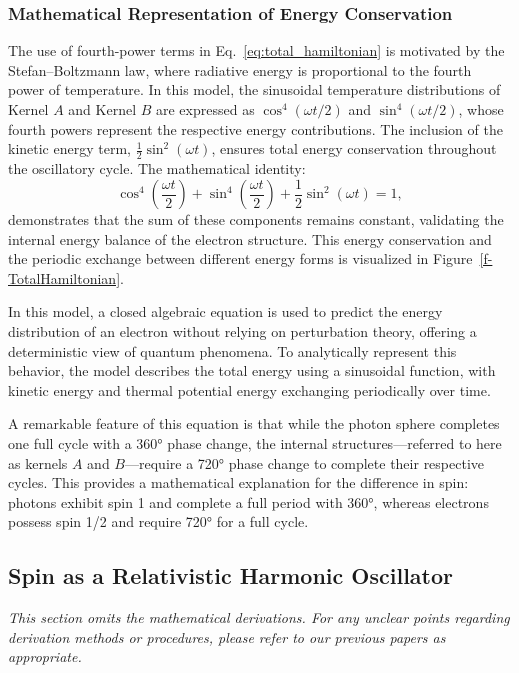 \documentclass[%
 reprint,
 amsmath,amssymb,
 aps,
]{revtex4-1}
\numberwithin{equation}{section}%
\begin{document}
\subsubsection{Mathematical Representation of Energy Conservation}
The use of fourth-power terms in Eq.~\eqref{eq:total_hamiltonian} is motivated by the Stefan–Boltzmann law, where radiative energy is proportional to the fourth power of temperature. In this model, the sinusoidal temperature distributions of Kernel $A$ and Kernel $B$ are expressed as $\cos^4(\omega t/2)$ and $\sin^4(\omega t/2)$, whose fourth powers represent the respective energy contributions. The inclusion of the kinetic energy term, $\frac{1}{2}\sin^2(\omega t)$, ensures total energy conservation throughout the oscillatory cycle. The mathematical identity:
\[
\cos^4\left(\frac{\omega t}{2}\right) + \sin^4\left(\frac{\omega t}{2}\right) + \frac{1}{2}\sin^2(\omega t) = 1,
\]
demonstrates that the sum of these components remains constant, validating the internal energy balance of the electron structure. This energy conservation and the periodic exchange between different energy forms is visualized in Figure~\ref{f-TotalHamiltonian}.

In this model, a closed algebraic equation is used to predict the energy distribution of an electron without relying on perturbation theory, offering a deterministic view of quantum phenomena. To analytically represent this behavior, the model describes the total energy using a sinusoidal function, with kinetic energy and thermal potential energy exchanging periodically over time.

A remarkable feature of this equation is that while the photon sphere completes one full cycle with a 360° phase change, the internal structures—referred to here as kernels $A$ and $B$—require a 720° phase change to complete their respective cycles. This provides a mathematical explanation for the difference in spin: photons exhibit spin 1 and complete a full period with 360°, whereas electrons possess spin 1/2 and require 720° for a full cycle.


\subsection{Spin as a Relativistic Harmonic Oscillator}

\textit{\small This section omits the mathematical derivations. For any unclear points regarding derivation methods or procedures, please refer to our previous papers as appropriate.}
\end{document}
